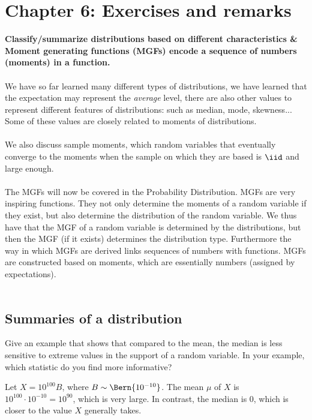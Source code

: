 

\chapter{Chapter 6: Exercises and remarks}
\textbf{Classify/summarize distributions based on different characteristics \& Moment generating functions (MGFs) encode a sequence of numbers (moments) in a function.}  \\~\\
We have so far learned many different types of distributions, we have learned that the expectation may represent the \textit{average} level, there are also other values to represent different features of distributions: such as median, mode, skewness... Some of these values are closely related to moments of distributions.\\~\\
We also discuss sample moments, which random variables that eventually converge to the moments when the sample on which they are based is $\iid$ and large enough.\\~\\
The MGFs will now be covered in the Probability Distribution. MGFs are very inspiring functions. They not only determine the moments of a random variable if they exist, but also determine the distribution of the random variable. We thus have that the MGF of a random variable is determined by the
distributions, but then the MGF (if it exists) determines the distribution type. Furthermore the way in which MGFs are derived links
sequences of numbers with functions. 
MGFs are constructed based on moments, which are essentially numbers (assigned by expectations).\\~~\\

\section{Summaries of a distribution}
\label{sec:section-6.1}

\begin{exercise}\label{ex:chap06 1}
		Give an example that shows that compared to the mean, the median is less sensitive to extreme values in the support of a random variable. In your example, which statistic do you find more informative?
		\begin{solution}
			Let $X = 10^{100} B$, where $B \sim \Bern{10^{-10}}$. The mean $\mu$ of $X$ is $10^{100} \cdot 10^{-10} = 10^{90}$, which is very large. In contrast, the median is 0, which is closer to the value $X$ generally takes.
		\end{solution}
	\end{exercise}
	
